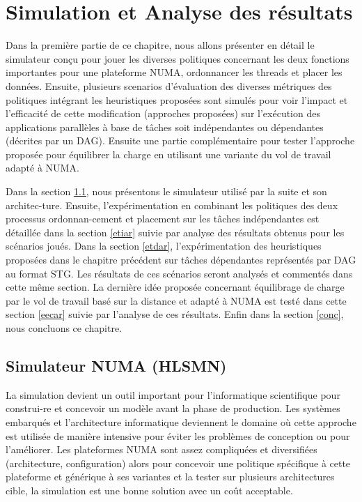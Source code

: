 ﻿\chapter{Simulation et Analyse des résultats}\label{simulation}
Dans la première partie de ce chapitre, 
nous allons présenter en détail le simulateur conçu pour jouer les diverses politiques concernant les deux fonctions importantes pour une plateforme NUMA, ordonnancer les threads et placer les données. 
Ensuite, plusieurs scenarios d'évaluation des diverses métriques des politiques intégrant les heuristiques proposées sont simulés pour voir l'impact et l'efficacité de cette modification (approches proposées) sur l'exécution des applications parallèles à base de tâches soit indépendantes ou dépendantes (décrites par un DAG). Ensuite une partie complémentaire pour tester l'approche proposée pour équilibrer la charge en utilisant une variante du vol de travail adapté à NUMA.

Dans la section \ref{simHLSM}, nous présentons le simulateur utilisé par la suite et son architec-ture. 
Ensuite, l'expérimentation en combinant les politiques des deux processus ordonnan-cement et placement sur les tâches indépendantes est détaillée dans la section \ref{etiar} suivie par analyse des résultats obtenus pour les scénarios joués.
Dans la section \ref{etdar}, l'expérimentation des heuristiques proposées dans le chapitre précédent sur tâches dépendantes représentés par  DAG au format STG. Les résultats de ces scénarios seront analysés et commentés dans cette même section.   
La dernière idée proposée concernant équilibrage de charge par le vol de travail basé sur la distance et adapté à NUMA est testé dans cette section \ref{eecar} suivie par l'analyse de ces résultats.
Enfin dans la section \ref{conc}, nous concluons ce chapitre.
\section{Simulateur NUMA (HLSMN)} \label{simHLSM}
%
La simulation devient un outil important pour l'informatique scientifique pour construi-re et concevoir un modèle avant la phase de production. Les systèmes embarqués et l'architecture informatique deviennent le domaine où cette approche est utilisée de manière intensive pour éviter les problèmes de conception ou pour l'améliorer. 
Les plateformes NUMA sont assez compliquées et diversifiées (architecture, configuration) alors pour concevoir une politique spécifique à cette plateforme et générique à ses variantes et la tester sur plusieurs architectures cible, la simulation est une bonne solution avec un coût acceptable.%
%
